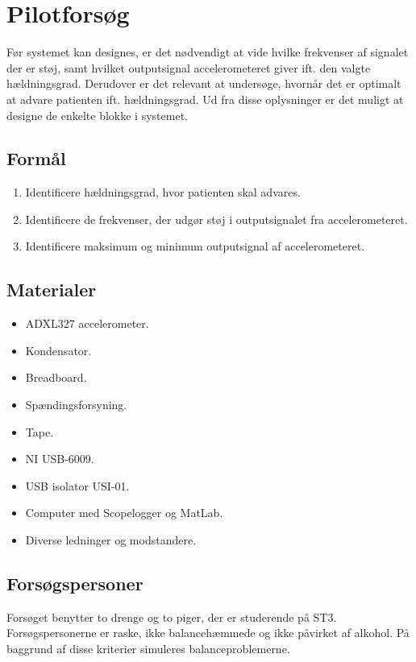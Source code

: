 \section{Pilotforsøg}
Før systemet kan designes, er det nødvendigt at vide hvilke frekvenser af signalet der er støj, samt hvilket outputsignal accelerometeret giver ift. den valgte hældningsgrad. Derudover er det relevant at undersøge, hvornår det er optimalt at advare patienten ift. hældningsgrad. Ud fra disse oplysninger er det muligt at designe de enkelte blokke i systemet.%

\subsection{Formål}
\begin{enumerate}
\item Identificere hældningsgrad, hvor patienten skal advares.
\item Identificere de frekvenser, der udgør støj i outputsignalet fra accelerometeret.
\item Identificere maksimum og minimum outputsignal af accelerometeret.
\end{enumerate}

\subsection{Materialer}
\begin{itemize}
\item ADXL327 accelerometer.
\item Kondensator.
\item Breadboard.
\item Spændingsforsyning.
\item Tape.
\item NI USB-6009.
\item USB isolator USI-01.
\item Computer med Scopelogger og MatLab.
\item Diverse ledninger og modstandere.
\end{itemize}

\subsection{Forsøgspersoner}
Forsøget benytter to drenge og to piger, der er studerende på ST3. Forsøgspersonerne er raske, ikke balancehæmmede og ikke påvirket af alkohol. På baggrund af disse kriterier simuleres balanceproblemerne. 


